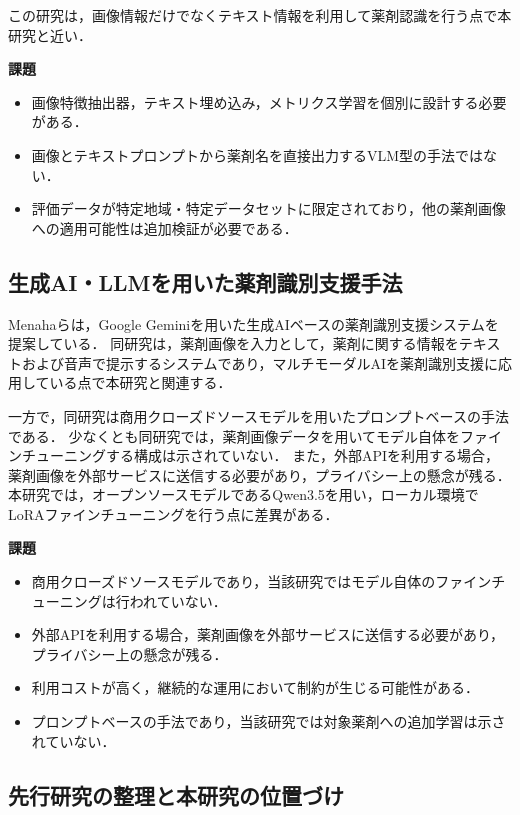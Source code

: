 \documentclass{jsarticle}
\begin{document}
この研究は，画像情報だけでなくテキスト情報を利用して薬剤認識を行う点で本研究と近い．

\textbf{課題}
\begin{itemize}
  \item 画像特徴抽出器，テキスト埋め込み，メトリクス学習を個別に設計する必要がある．
  \item 画像とテキストプロンプトから薬剤名を直接出力するVLM型の手法ではない．
  \item 評価データが特定地域・特定データセットに限定されており，他の薬剤画像への適用可能性は追加検証が必要である．
\end{itemize}

\subsection{生成AI・LLMを用いた薬剤識別支援手法}

Menahaら\cite{gemini2024pill}は，Google Geminiを用いた生成AIベースの薬剤識別支援システムを提案している．
同研究は，薬剤画像を入力として，薬剤に関する情報をテキストおよび音声で提示するシステムであり，マルチモーダルAIを薬剤識別支援に応用している点で本研究と関連する．

一方で，同研究は商用クローズドソースモデルを用いたプロンプトベースの手法である．
少なくとも同研究では，薬剤画像データを用いてモデル自体をファインチューニングする構成は示されていない．
また，外部APIを利用する場合，薬剤画像を外部サービスに送信する必要があり，プライバシー上の懸念が残る．
本研究では，オープンソースモデルであるQwen3.5を用い，ローカル環境でLoRAファインチューニングを行う点に差異がある．

\textbf{課題}
\begin{itemize}
  \item 商用クローズドソースモデルであり，当該研究ではモデル自体のファインチューニングは行われていない．
  \item 外部APIを利用する場合，薬剤画像を外部サービスに送信する必要があり，プライバシー上の懸念が残る．
  \item 利用コストが高く，継続的な運用において制約が生じる可能性がある．
  \item プロンプトベースの手法であり，当該研究では対象薬剤への追加学習は示されていない．
\end{itemize}

\subsection{先行研究の整理と本研究の位置づけ}
\end{document}
